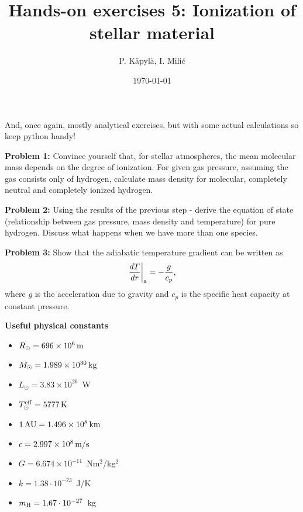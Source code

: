 \documentclass[12pt]{article}
\title{Hands-on exercises 5: Ionization of stellar material}
\author{P. K\"{a}pyl\"{a}, I. Mili\'{c}}
\date{\today}
\begin{document}
\maketitle


And, once again, mostly analytical exercises, but with some actual calculations so keep python handy! 

{\bf Problem 1:} Convince yourself that, for stellar atmospheres, the mean molecular mass depends on the degree of ionization. For given gas pressure, assuming the gas consists only of hydrogen, calculate mass density for molecular, completely neutral and completely ionized hydrogen. 

{\bf Problem 2:} Using the results of the previous step - derive the equation of state (relationship between gas pressure, mass density and temperature) for pure hydrogen. Discuss what happens when we have more than one species. 

{\bf Problem 3:} Show that the adiabatic temperature gradient can be
written as
\begin{equation}
\left.\frac{dT}{dr}\right|_{\rm a} = -\frac{g}{c_p},
\end{equation}
where $g$ is the acceleration due to gravity and $c_p$ is the specific
heat capacity at constant pressure.


{\bf Useful physical constants}
\begin{itemize}
  \item $R_{\odot} = 696 \times 10^6\,{\rm m}$
  \item $M_{\odot} = 1.989 \times 10^{30}\,{\rm kg}$
  \item $L_{\odot} = 3.83 \times 10^{26}$~W
  \item $T^{\rm eff}_{\odot} = 5777\,{\rm K}$
  \item $1\,{\rm AU} = 1.496 \times 10^8\,{\rm km}$
  \item $c = 2.997 \times 10^8\,{\rm m/s}$
  \item $G = 6.674 \times 10^{-11}$~Nm$^2$/kg$^2$
  \item $k = 1.38\cdot10^{-23}$~J/K
  \item $m_{\rm H} = 1.67\cdot10^{-27}$~kg
\end{itemize}
\end{document}
